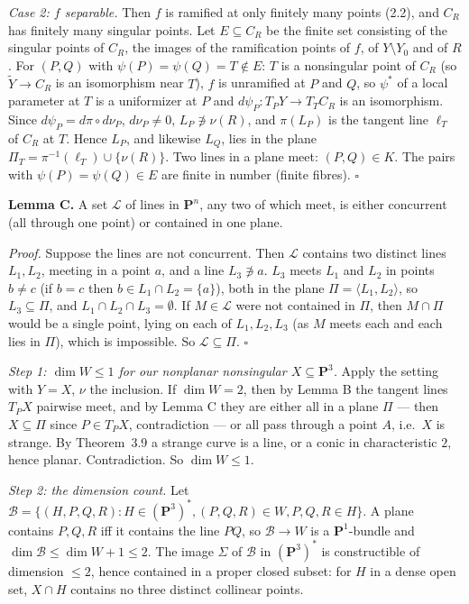 \documentclass[11pt]{article}
\begin{document}
\emph{Case 2: $f$ separable.} Then $f$ is ramified at only finitely many points (2.2), and $C_R$ has finitely many singular points. Let $E\subseteq C_R$ be the finite set consisting of the singular points of $C_R$, the images of the ramification points of $f$, of $Y\setminus Y_0$ and of $R$. For $(P,Q)$ with $\psi(P)=\psi(Q)=T\notin E$: $T$ is a nonsingular point of $C_R$ (so $\tilde Y\to C_R$ is an isomorphism near $T$), $f$ is unramified at $P$ and $Q$, so $\psi^*$ of a local parameter at $T$ is a uniformizer at $P$ and $d\psi_P:T_PY\to T_TC_R$ is an isomorphism. Since $d\psi_P=d\pi\circ d\nu_P$, $d\nu_P\ne0$, $L_P\not\ni\nu(R)$, and $\pi(L_P)$ is the tangent line $\ell_T$ of $C_R$ at $T$. Hence $L_P$, and likewise $L_Q$, lies in the plane $\Pi_T=\pi^{-1}(\ell_T)\cup\{\nu(R)\}$. Two lines in a plane meet: $(P,Q)\in K$. The pairs with $\psi(P)=\psi(Q)\in E$ are finite in number (finite fibres). \hfill$\square$

\textbf{Lemma C.} A set $\mathcal L$ of lines in $\mathbf P^n$, any two of which meet, is either concurrent (all through one point) or contained in one plane.

\emph{Proof.} Suppose the lines are not concurrent. Then $\mathcal L$ contains two distinct lines $L_1,L_2$, meeting in a point $a$, and a line $L_3\not\ni a$. $L_3$ meets $L_1$ and $L_2$ in points $b\ne c$ (if $b=c$ then $b\in L_1\cap L_2=\{a\}$), both in the plane $\Pi=\langle L_1,L_2\rangle$, so $L_3\subseteq\Pi$, and $L_1\cap L_2\cap L_3=\emptyset$. If $M\in\mathcal L$ were not contained in $\Pi$, then $M\cap\Pi$ would be a single point, lying on each of $L_1,L_2,L_3$ (as $M$ meets each and each lies in $\Pi$), which is impossible. So $\mathcal L\subseteq\Pi$. \hfill$\square$

\emph{Step 1: $\dim W\le1$ for our nonplanar nonsingular $X\subseteq\mathbf P^3$.} Apply the setting with $Y=X$, $\nu$ the inclusion. If $\dim W=2$, then by Lemma B the tangent lines $T_PX$ pairwise meet, and by Lemma C they are either all in a plane $\Pi$ --- then $X\subseteq\Pi$ since $P\in T_PX$, contradiction --- or all pass through a point $A$, i.e.\ $X$ is strange. By Theorem~3.9 a strange curve is a line, or a conic in characteristic $2$, hence planar. Contradiction. So $\dim W\le1$.

\emph{Step 2: the dimension count.} Let $\mathcal B=\{(H,P,Q,R):H\in(\mathbf P^3)^*,(P,Q,R)\in W,P,Q,R\in H\}$. A plane contains $P,Q,R$ iff it contains the line $PQ$, so $\mathcal B\to W$ is a $\mathbf P^1$-bundle and $\dim\mathcal B\le\dim W+1\le2$. The image $\Sigma$ of $\mathcal B$ in $(\mathbf P^3)^*$ is constructible of dimension $\le2$, hence contained in a proper closed subset: for $H$ in a dense open set, $X\cap H$ contains no three distinct collinear points.
\end{document}
